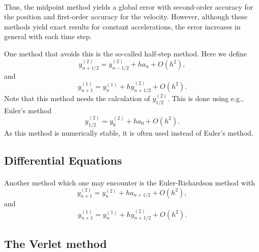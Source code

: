 \documentclass[%
oneside,                 %
final,                   %
10pt]{article}
\begin{document}
\paragraph{}
Thus, the midpoint method yields a global error with 
second-order accuracy for
the position and first-order accuracy for the velocity. However, although these methods yield exact results for
constant accelerations, the error increases in general with each time step.

One method that avoids this is the so-called half-step method. Here we define
\begin{equation}
   y^{(2)}_{n+1/2}=y^{(2)}_{n-1/2}+h a_{n}+O(h^2),
\end{equation}
and 
\begin{equation}
   y^{(1)}_{n+1}=y^{(1)}_{n}+hy^{(2)}_{n+1/2} +O(h^2).
\end{equation}
Note that this method needs the calculation of $y^{(2)}_{1/2}$. This is done using 
e.g., Euler's method
\begin{equation}
   y^{(2)}_{1/2}=y^{(2)}_{0}+h a_{0}+O(h^2).
\end{equation}
As this method is numerically stable, it is often used instead of Euler's method.




\subsection{Differential Equations}

\paragraph{}
Another method which one may encounter is the Euler-Richardson method
with
\begin{equation}
   y^{(2)}_{n+1}=y^{(2)}_{n}+h a_{n+1/2}+O(h^2),
   \label{eq:er1}
\end{equation}
and 
\begin{equation}
   \label{eq:er2}
   y^{(1)}_{n+1}=y^{(1)}_{n}+hy^{(2)}_{n+1/2} +O(h^2).
\end{equation}



\subsection{The Verlet method}
\end{document}
